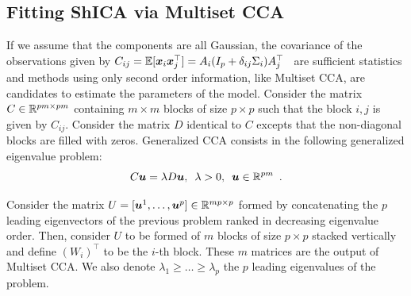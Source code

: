 \subsection{Fitting ShICA via Multiset CCA}
If we assume that the components are all Gaussian, %
the covariance of the observations given by
$C_{ij}=  \mathbb{E}[\boldsymbol{x}_i\boldsymbol{x}_j^\top] = A_i(I_p + \delta_{ij}\Sigma_i)A_j^{\top}\enspace
$ are sufficient statistics and methods using only second order information, like Multiset CCA, are candidates to estimate the parameters of the model.
Consider the
matrix $C \in \mathbb{R}^{pm \times pm}$ containing $m \times m$ blocks of size $p
\times p$
such that the block $i,j$ is given by $C_{ij}$. Consider the matrix $D$ identical to $C$ excepts that the non-diagonal blocks are filled with zeros. 
Generalized CCA consists in the following generalized eigenvalue problem:
\begin{equation}
\label{eq:eigv}
    C \boldsymbol{u} = \lambda D\boldsymbol{u},\enspace \lambda > 0,\enspace \boldsymbol{u}\in\mathbb{R}^{pm} \enspace .
\end{equation}
  
Consider the matrix $U = [\boldsymbol{u}^1, \dots, \boldsymbol{u}^p] \in \mathbb{R}^{mp \times p}$ formed by concatenating the $p$ leading eigenvectors of the previous problem ranked in decreasing eigenvalue order. Then, consider $U$ to be formed of $m$ blocks of size $p \times p$ stacked vertically and define $(W_i)^{\top}$ to be the $i$-th block. These $m$ matrices are the output of Multiset CCA. We also denote $\lambda_1 \geq \dots \geq \lambda_p$ the $p$ leading eigenvalues of the problem.

